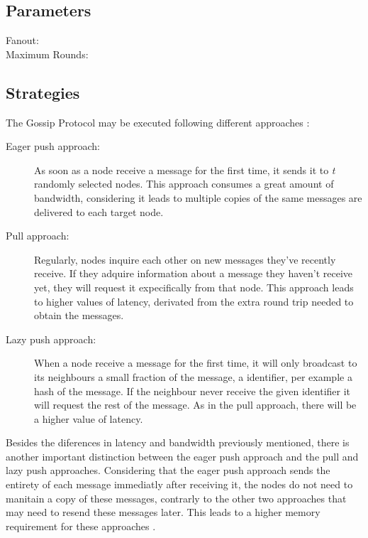 

\subsection{Parameters}
\label{subsec:gossip_parameters}
\begin{description}
    \item[Fanout:]
    \item[Maximum Rounds:]
\end{description}


\subsection{Strategies}
\label{subsec:gossip_strategies}
The Gossip Protocol may be executed following different approaches \cite{Karp2000}:
\begin{description}
    \item[Eager push approach:] As soon as a node receive a message for the first time,
        it sends it to \textit{t} randomly selected nodes. This approach consumes a great
        amount of bandwidth, considering it leads to multiple copies of the same messages
        are delivered to each target node.
    \item[Pull approach:] Regularly, nodes inquire each other on new messages they've
        recently receive. If they adquire information about a message they haven't receive
        yet, they will request it expecifically from that node. This approach leads to higher
        values of latency, derivated from the extra round trip needed to obtain the messages.
    \item[Lazy push approach:] When a node receive a message for the first time, it will only
        broadcast to its neighbours a small fraction of the message, a identifier, per example
        a hash of the message. If the neighbour never receive the given identifier it will request
        the rest of the message. As in the pull approach, there will be a higher value of latency.
\end{description}

Besides the diferences in latency and bandwidth previously mentioned, there is another important
distinction between the eager push approach and the pull and lazy push approaches.
Considering that the eager push approach sends the entirety of each message immediatly after
receiving it, the nodes do not need to manitain a copy of these messages, contrarly to the
other two approaches that may need to resend these messages later. This leads to a higher
memory requirement for these approaches \cite{Leitao2012}.

